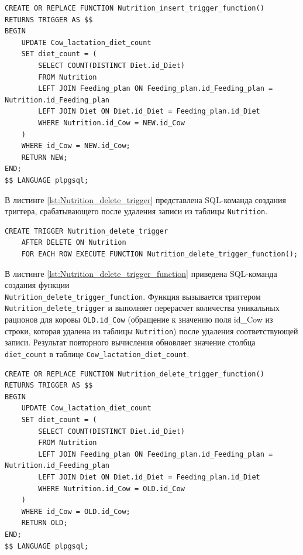 \begin{lstlisting}[caption={Создание функции Nutrition\_insert\_trigger\_function}, label={lst:Nutrition_insert_trigger_function}]
CREATE OR REPLACE FUNCTION Nutrition_insert_trigger_function()
RETURNS TRIGGER AS $$
BEGIN 
    UPDATE Cow_lactation_diet_count 
    SET diet_count = (
        SELECT COUNT(DISTINCT Diet.id_Diet)
        FROM Nutrition
        LEFT JOIN Feeding_plan ON Feeding_plan.id_Feeding_plan = Nutrition.id_Feeding_plan
        LEFT JOIN Diet ON Diet.id_Diet = Feeding_plan.id_Diet
        WHERE Nutrition.id_Cow = NEW.id_Cow
    )
    WHERE id_Cow = NEW.id_Cow; 
    RETURN NEW;
END;
$$ LANGUAGE plpgsql;
\end{lstlisting}

В листинге \ref{lst:Nutrition_delete_trigger} представлена SQL-команда создания триггера,
срабатывающего после удаления записи из таблицы \texttt{Nutrition}.

\begin{lstlisting}[caption={Создание триггера Nutrition\_delete\_trigger}, label={lst:Nutrition_delete_trigger}]
CREATE TRIGGER Nutrition_delete_trigger
    AFTER DELETE ON Nutrition
    FOR EACH ROW EXECUTE FUNCTION Nutrition_delete_trigger_function();
\end{lstlisting}

В листинге \ref{lst:Nutrition_delete_trigger_function} приведена SQL-команда создания функции
\\\texttt{Nutrition\_delete\_trigger\_function}.
Функция вызывается триггером \texttt{Nutrition\_delete\_trigger} и выполняет перерасчет количества
уникальных рационов для коровы \texttt{OLD.id\_Cow} (обращение к значению поля id\_Cow из строки,
которая удалена из таблицы \texttt{Nutrition}) после удаления соответствующей записи.
Результат повторного вычисления обновляет значение столбца \texttt{diet\_count} в таблице
\texttt{Cow\_lactation\_diet\_count}.

\begin{lstlisting}[caption={Создание функции Nutrition\_delete\_trigger\_function}, label={lst:Nutrition_delete_trigger_function}]
CREATE OR REPLACE FUNCTION Nutrition_delete_trigger_function()
RETURNS TRIGGER AS $$
BEGIN
    UPDATE Cow_lactation_diet_count 
    SET diet_count = (
        SELECT COUNT(DISTINCT Diet.id_Diet)
        FROM Nutrition
        LEFT JOIN Feeding_plan ON Feeding_plan.id_Feeding_plan = Nutrition.id_Feeding_plan
        LEFT JOIN Diet ON Diet.id_Diet = Feeding_plan.id_Diet
        WHERE Nutrition.id_Cow = OLD.id_Cow
    )
    WHERE id_Cow = OLD.id_Cow; 
    RETURN OLD;
END;
$$ LANGUAGE plpgsql;
\end{lstlisting}

